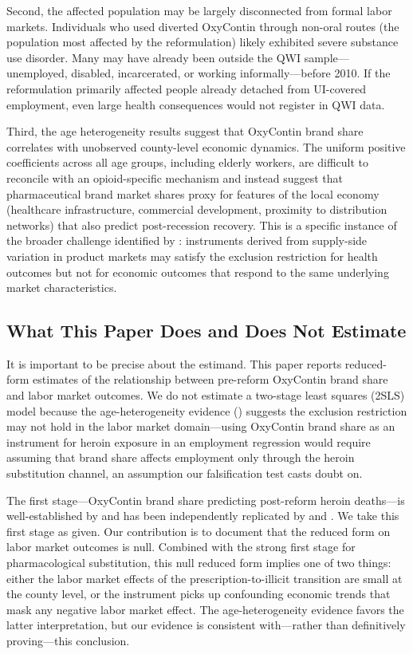 \documentclass[12pt]{article}
\begin{document}
Second, the affected population may be largely disconnected from formal labor markets. Individuals who used diverted OxyContin through non-oral routes (the population most affected by the reformulation) likely exhibited severe substance use disorder. Many may have already been outside the QWI sample---unemployed, disabled, incarcerated, or working informally---before 2010. If the reformulation primarily affected people already detached from UI-covered employment, even large health consequences would not register in QWI data.

Third, the age heterogeneity results suggest that OxyContin brand share correlates with unobserved county-level economic dynamics. The uniform positive coefficients across all age groups, including elderly workers, are difficult to reconcile with an opioid-specific mechanism and instead suggest that pharmaceutical brand market shares proxy for features of the local economy (healthcare infrastructure, commercial development, proximity to distribution networks) that also predict post-recession recovery. This is a specific instance of the broader challenge identified by \citet{goldsmith2020}: instruments derived from supply-side variation in product markets may satisfy the exclusion restriction for health outcomes but not for economic outcomes that respond to the same underlying market characteristics.

\subsection{What This Paper Does and Does Not Estimate}

It is important to be precise about the estimand. This paper reports reduced-form estimates of the relationship between pre-reform OxyContin brand share and labor market outcomes. We do not estimate a two-stage least squares (2SLS) model because the age-heterogeneity evidence () suggests the exclusion restriction may not hold in the labor market domain---using OxyContin brand share as an instrument for heroin exposure in an employment regression would require assuming that brand share affects employment only through the heroin substitution channel, an assumption our falsification test casts doubt on.

The first stage---OxyContin brand share predicting post-reform heroin deaths---is well-established by \citet{alpert2018} and has been independently replicated by \citet{evans2019} and \citet{powell2020}. We take this first stage as given. Our contribution is to document that the reduced form on labor market outcomes is null. Combined with the strong first stage for pharmacological substitution, this null reduced form implies one of two things: either the labor market effects of the prescription-to-illicit transition are small at the county level, or the instrument picks up confounding economic trends that mask any negative labor market effect. The age-heterogeneity evidence favors the latter interpretation, but our evidence is consistent with---rather than definitively proving---this conclusion.
\end{document}
